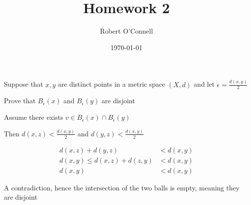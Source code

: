 \documentclass{article}
\title{\textbf{Homework 2}}
\author{Robert O'Connell}
\date{\today}
\begin{document}
\maketitle

\begin{problem}
Suppose that \( x,y \) are distinct points in a metric space \( (X,d) \) and let \( \epsilon = \frac{d(x,y)}{2} \)

Prove that \( B_{\epsilon}(x) \) and \( B_{\epsilon}(y) \) are disjoint
%
%
%
\begin{solution}
	Assume there exists \( v \in B_{\epsilon}(x) \cap B_{\epsilon}(y) \)

	Then \( d(x,z) < \frac{d(x,y)}{2} \) and \( d(y,z) < \frac{d(x,y)}{2} \)

	\begin{align*}
		d(x,z) + d(y,z)            & < d(x,y) \\
		d(x,y) \le d(x,z) + d(z,y) & < d(x,y) \\
		d(x,y)                     & < d(x,y)
	\end{align*}

	A contradiction, hence the intersection of the two balls is empty, meaning they are disjoint
\end{solution}
\end{problem}
\end{document}
